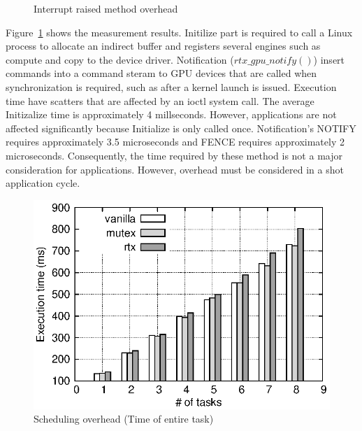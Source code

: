 \begin{figure}[!t]
\begin{center}
\caption{Interrupt raised method overhead}
\label{fig:irq_rise_overhead}
\end{center}
\end{figure}

Figure~\ref{fig:irq_rise_overhead} shows the measurement results.
Initilize part is required to call a Linux process to allocate an indirect buffer and registers several engines such as compute and copy to the device driver.
Notification ($rtx\_gpu\_notify()$) insert commands into a command steram to GPU devices that are called when synchronization is required, such as after a kernel launch is issued.
Execution time have scatters that are affected by an ioctl system call.
The average Initizalize time is approximately 4 millseconds.
However, applications are not affected significantly because Initialize is only called once.
Notification's NOTIFY requires approximately 3.5 microseconds and FENCE requires approximately 2 microseconds.
Consequently, the time required by these method is not a major consideration for applications.
However, overhead must be considered in a shot application cycle.

\label{sec:eval:sched_overhead}

\begin{figure}[!t]
\begin{center}
\includegraphics[width=.44\textwidth]{img/sum_task.eps}
\caption{Scheduling overhead (Time of entire task)}
\label{fig:fp_task_overhead}
\end{center}
\end{figure}

